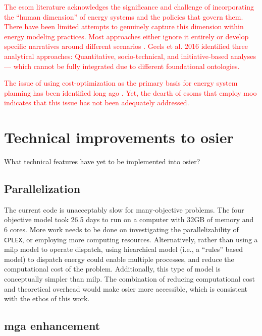 \textcolor{red}{The \ac{esom} literature acknowledges the significance and challenge of incorporating
the ``human dimension'' \cite{pfenninger_energy_2014} of energy systems and the policies that govern them.
There have been limited attempts to genuinely capture this dimension within energy modeling practices. Most
approaches either ignore it entirely or develop specific narratives around different scenarios \cite{alcamo_chapter_2008}.
Geels et al. 2016 \cite{geels_bridging_2016} identified three analytical approaches: Quantitative, socio-technical,
and initiative-based analyses --- which cannot be fully integrated due to different foundational ontologies.}

\textcolor{red}{The issue of using cost-optimization as the primary basis for energy system planning has been identified long ago 
\cite{hobbs_optimization_1995,ribeiro_inclusion_2011}. Yet, the dearth of \acp{esom} that employ \ac{moo} indicates that this issue
has not been adequately addressed.}



\section{Technical improvements to \ac{osier}}

What technical features have yet to be implemented into \ac{osier}?


\subsection{Parallelization}

The current code is unacceptably slow for many-objective problems. The four
objective model took 26.5 days to run on a computer with 32GB of memory and 6
cores. More work needs to be done on investigating the parallelizability of
\texttt{CPLEX}, or employing more computing resources. Alternatively, rather
than using a \ac{milp} model to operate dispatch, using hiearchical model (i.e.,
a ``rules'' based model) to dispatch energy could enable multiple processes, and
reduce the computational cost of the problem. Additionally, this type of model
is conceptually simpler than \ac{milp}. The combination of reducing
computational cost and theoretical overhead would make \ac{osier} more
accessible, which is consistent with the ethos of this work.


\subsection{\ac{mga} enhancement}

